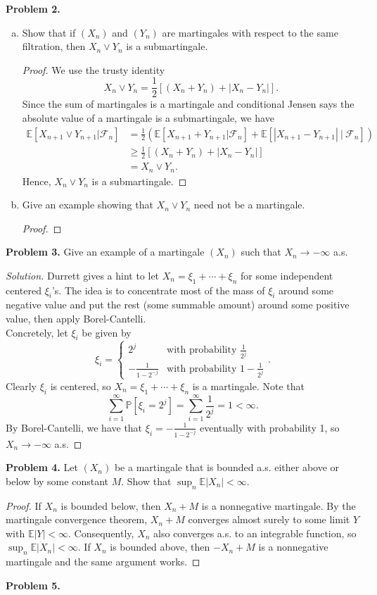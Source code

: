 \documentclass[11pt,letterpaper]{report}
\newcommand{\mcal}[1]{\mathcal{#1}}
\newcommand{\E}{\mathbb{E}}
\newcommand{\Prob}{\mathbb{P}}
\newenvironment{solution}
{\begin{proof}[Solution]}
{\end{proof}}
\begin{document}
\noindent\textbf{Problem 2. }
\begin{enumerate}[(a)]
	\item Show that if $(X_n)$ and $(Y_n)$ are martingales with respect to the same filtration, then $X_n\lor Y_n$ is a submartingale.
	\begin{proof}
		We use the trusty identity
		\[
		X_n\lor Y_n = \frac{1}{2}[(X_n+Y_n) + |X_n - Y_n|].
		\]
		Since the sum of martingales is a martingale and conditional Jensen says the absolute value of a martingale is a submartingale, we have
		\begin{align*}
			\E[X_{n+1}\lor Y_{n+1}|\mcal{F}_n] &= \frac{1}{2}(\E[X_{n+1}+Y_{n+1}|\mcal{F}_n] + \E[|X_{n+1} -Y_{n+1}|\ |\ \mcal{F}_n])\\
			&\geq \frac{1}{2}[(X_n + Y_n) + |X_n - Y_n|]\\
			&= X_n\lor Y_n.
		\end{align*}
		Hence, $X_n\lor Y_n$ is a submartingale.
	\end{proof}

	\item Give an example showing that $X_n \lor Y_n$ need not be a martingale.
	\begin{proof}
		
	\end{proof}
\end{enumerate}

\noindent\textbf{Problem 3. }
Give an example of a martingale $(X_n)$ such that $X_n\to -\infty$ a.s.
\begin{solution}
	Durrett gives a hint to let $X_n = \xi_1 + \cdots + \xi_n$ for some independent centered $\xi_i$'s. The idea is to concentrate most of the mass of $\xi_i$ around some negative value and put the rest (some summable amount) around some positive value, then apply Borel-Cantelli.\\

	\noindent Concretely, let $\xi_i$ be given by
	\[
	\xi_i = \begin{cases}
		2^j&\text{with probability }\frac{1}{2^j}\\
		-\frac{1}{1-2^{-j}}&\text{with probability }1-\frac{1}{2^j}
	\end{cases}.
	\]
	Clearly $\xi_i$ is centered, so $X_n = \xi_1 + \cdots + \xi_n$ is a martingale. Note that
	\[
	\sum_{i=1}^\infty \Prob[\xi_i = 2^j] = \sum_{i=1}^\infty \frac{1}{2^j} = 1<\infty.
	\]
	By Borel-Cantelli, we have that $\xi_i = -\frac{1}{1-2^{-j}}$ eventually with probability 1, so $X_n\to -\infty$ a.s.
\end{solution}

\noindent\textbf{Problem 4. }
Let $(X_n)$ be a martingale that is bounded a.s. either above or below by some constant $M$. Show that $\sup_n \E|X_n|<\infty$.
\begin{proof}
	If $X_n$ is bounded below, then $X_n+M$ is a nonnegative martingale. By the martingale convergence theorem, $X_n+M$ converges almost surely to some limit $Y$ with $\E|Y|<\infty$. Consequently, $X_n$ also converges a.s. to an integrable function, so $\sup_n \E|X_n|<\infty$. If $X_n$ is bounded above, then $-X_n+M$ is a nonnegative martingale and the same argument works.
\end{proof}

\noindent\textbf{Problem 5. }
\end{document}
